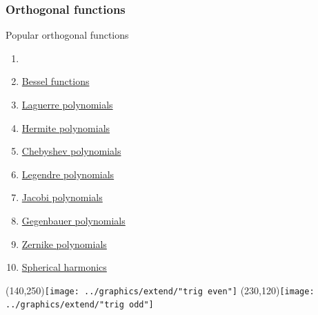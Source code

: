 \documentclass[handout]{beamer}
\begin{document}
\begin{frame}      %
\frametitle{Orthogonal functions}
  Popular orthogonal functions
  \begin{enumerate}
    \item {}
    \item \href{http://mathworld.wolfram.com/BesselFunction.html}{Bessel functions}
    \item \href{http://mathworld.wolfram.com/LaguerrePolynomial.html}{Laguerre polynomials}
    \item \href{http://mathworld.wolfram.com/HermitePolynomial.html}{Hermite polynomials}
    \item \href{http://mathworld.wolfram.com/ChebyshevPolynomialoftheFirstKind.html}{Chebyshev polynomials}
    \item \href{http://mathworld.wolfram.com/LegendrePolynomial.html}{Legendre polynomials}
    \item \href{http://mathworld.wolfram.com/JacobiPolynomial.html}{Jacobi polynomials}
    \item \href{http://mathworld.wolfram.com/GegenbauerPolynomial.html}{Gegenbauer polynomials}
    \item \href{http://mathworld.wolfram.com/ZernikePolynomial.html}{Zernike polynomials}
    \item \href{http://mathworld.wolfram.com/SphericalHarmonic.html}{Spherical harmonics}
  \end{enumerate}
    \Put(140,250){\texttt{[image: ../graphics/extend/"trig even"]}}
    \Put(230,120){\texttt{[image: ../graphics/extend/"trig odd"]}}
\end{frame}
\end{document}
